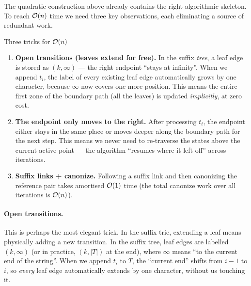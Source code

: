 The quadratic construction above already contains the right algorithmic
skeleton.
To reach $\mathcal{O}\!\left(n\right)$ time we need three key observations, each eliminating
a source of redundant work.

\begin{intermezzo}{Three tricks for $\mathcal{O}\!\left(n\right)$}

\begin{enumerate}
  \item \textbf{Open transitions (leaves extend for free).}
        In the suffix \emph{tree}, a leaf edge is stored as $(k, \infty)$
        --- the right endpoint ``stays at infinity''.
        When we append $t_i$, the label of every existing leaf edge
        automatically grows by one character, because $\infty$ now
        covers one more position.
        This means the entire first zone of the boundary path
        (all the leaves) is updated \emph{implicitly}, at zero cost.

  \item \textbf{The endpoint only moves to the right.}
        After processing $t_i$, the endpoint either stays in the same
        place or moves deeper along the boundary path for the next step.
        This means we never need to re-traverse the states above the
        current active point --- the algorithm ``resumes where it left
        off'' across iterations.

  \item \textbf{Suffix links + canonize.}
        Following a suffix link and then canonizing the reference pair
        takes amortised $\mathcal{O}\!\left(1\right)$ time (the total canonize work over
        all iterations is $\mathcal{O}\!\left(n\right)$).
\end{enumerate}
\end{intermezzo}

\paragraph{Open transitions.}
This is perhaps the most elegant trick.
In the suffix trie, extending a leaf means physically adding a new
transition.
In the suffix tree, leaf edges are labelled $(k, \infty)$ (or in
practice, $(k, |T|)$ at the end), where $\infty$ means ``to the
current end of the string''.
When we append $t_i$ to $T$, the ``current end'' shifts from $i-1$ to
$i$, so \emph{every} leaf edge automatically extends by one character,
without us touching it.


